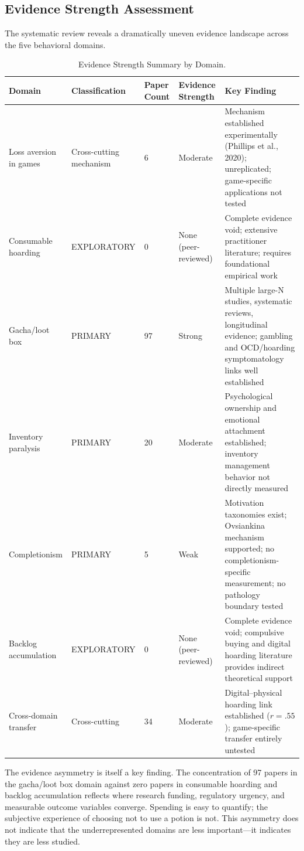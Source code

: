 \documentclass[12pt]{article}
\begin{document}
\subsection{Evidence Strength Assessment}

The systematic review reveals a dramatically uneven evidence landscape across the five behavioral domains.

\begin{table}[ht]
\centering
\caption{Evidence Strength Summary by Domain.}
\small
\begin{tabular}{p{2.3cm}p{1.8cm}p{1.3cm}p{1.5cm}p{5.5cm}}
\toprule
Domain & Classification & Paper Count & Evidence Strength & Key Finding \\
\midrule
Loss aversion in games & Cross-cutting mechanism & 6 & Moderate & Mechanism established experimentally (Phillips et al., 2020); unreplicated; game-specific applications not tested \\
Consumable hoarding & EXPLORATORY & 0 & None (peer-reviewed) & Complete evidence void; extensive practitioner literature; requires foundational empirical work \\
Gacha/loot box & PRIMARY & 97 & Strong & Multiple large-N studies, systematic reviews, longitudinal evidence; gambling and OCD/hoarding symptomatology links well established \\
Inventory paralysis & PRIMARY & 20 & Moderate & Psychological ownership and emotional attachment established; inventory management behavior not directly measured \\
Completionism & PRIMARY & 5 & Weak & Motivation taxonomies exist; Ovsiankina mechanism supported; no completionism-specific measurement; no pathology boundary tested \\
Backlog accumulation & EXPLORATORY & 0 & None (peer-reviewed) & Complete evidence void; compulsive buying and digital hoarding literature provides indirect theoretical support \\
Cross-domain transfer & Cross-cutting & 34 & Moderate & Digital--physical hoarding link established ($r = .55$); game-specific transfer entirely untested \\
\bottomrule
\end{tabular}
\end{table}

The evidence asymmetry is itself a key finding. The concentration of 97 papers in the gacha/loot box domain against zero papers in consumable hoarding and backlog accumulation reflects where research funding, regulatory urgency, and measurable outcome variables converge. Spending is easy to quantify; the subjective experience of choosing not to use a potion is not. This asymmetry does not indicate that the underrepresented domains are less important---it indicates they are less studied.
\end{document}
